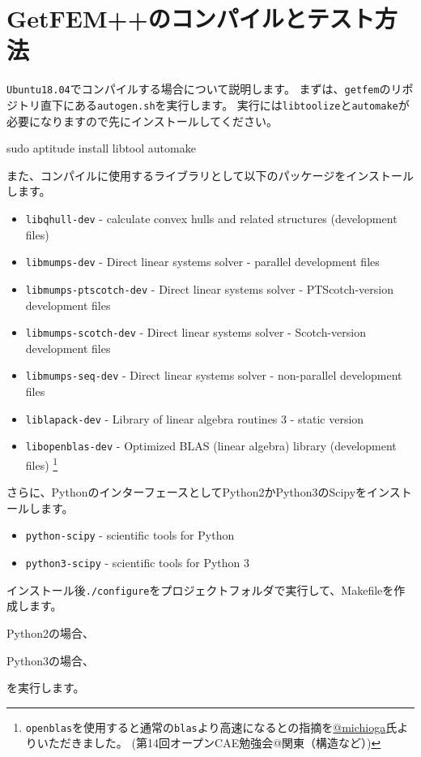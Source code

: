 \documentclass{../../style/ltjoc}
\begin{document}
\section{GetFEM++のコンパイルとテスト方法}
\texttt{Ubuntu18.04}でコンパイルする場合について説明します。
まずは、\texttt{getfem}のリポジトリ直下にある\texttt{autogen.sh}を実行します。
実行には\texttt{libtoolize}と\texttt{automake}が必要になりますので先にインストールしてください。
\begin{shbox}
  \shline{} {sudo aptitude install libtool automake}
\end{shbox}
また、コンパイルに使用するライブラリとして以下のパッケージをインストールします。
\begin{itemize}
  \item \texttt{libqhull-dev} - calculate convex hulls and related structures (development files)
  \item \texttt{libmumps-dev} - Direct linear systems solver - parallel development files                  
  \item \texttt{libmumps-ptscotch-dev} - Direct linear systems solver - PTScotch-version development files          
  \item \texttt{libmumps-scotch-dev} - Direct linear systems solver - Scotch-version development files            
  \item \texttt{libmumps-seq-dev} - Direct linear systems solver - non-parallel development files              
  \item \texttt{liblapack-dev} - Library of linear algebra routines 3 - static version
  \item \texttt{libopenblas-dev} - Optimized BLAS (linear algebra) library (development files)
  \footnote{
    \texttt{openblas}を使用すると通常の\texttt{blas}より高速になるとの指摘を\href{https://twitter.com/michioga}{@michioga}氏よりいただきました。
    (第14回オープンCAE勉強会@関東（構造など）)
  }
\end{itemize}
さらに、PythonのインターフェースとしてPython2かPython3のScipyをインストールします。
\begin{itemize}
  \item \texttt{python-scipy} - scientific tools for Python
  \item \texttt{python3-scipy} - scientific tools for Python 3
\end{itemize}
インストール後\texttt{./configure}をプロジェクトフォルダで実行して、Makefileを作成します。

Python2の場合、
\begin{shbox}
\end{shbox}
Python3の場合、
\begin{shbox}
\end{shbox}
を実行します。
\end{document}
